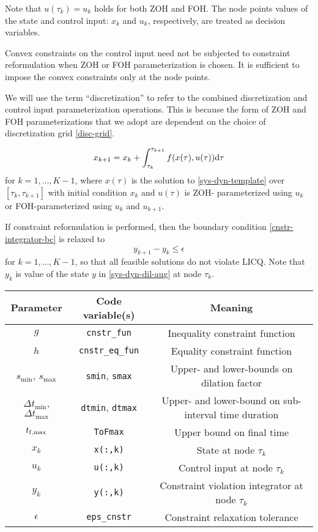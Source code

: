 \documentclass[11pt,a4paper]{article}
\begin{document}
Note that $u(\tau_k) = u_{k}$ holds for both ZOH and FOH. The node points values of the state and control input: $x_k$ and $u_k$, respectively, are treated as decision variables.

Convex constraints on the control input need not be subjected to constraint reformulation when ZOH or FOH parameterization is chosen. It is sufficient to impose the convex constraints only at the node points. 

We will use the term ``discretization'' to refer to the combined discretization and control input parameterization operations. This is because the form of ZOH and FOH parameterizations that we adopt are dependent on the choice of discretization grid \eqref{disc-grid}. 

\begin{align}
    x_{k+1} = x_{k} + \int_{\tau_k}^{\tau_{k+1}}f(x(\tau),u(\tau))\mathrm{d}\tau\label{disc-dyn}
\end{align}
for $k=1,\ldots,K-1$, where $x(\tau)$ is the solution to \eqref{sys-dyn-template} over $[\tau_k,\tau_{k+1}]$ with initial condition $x_k$ and $u(\tau)$ is ZOH- parameterized using $u_k$ or FOH-parameterized using $u_k$ and $u_{k+1}$.  

If constraint reformulation is performed, then the boundary condition \eqref{cnstr-integrator-bc} is relaxed to 
$$
    y_{k+1} - y_{k} \le \epsilon
$$
for $k=1,\ldots,K-1$, so that all feasible solutions do not violate LICQ. Note that $y_k$ is value of the state $y$ in \eqref{sys-dyn-dil-aug} at node $\tau_k$.

\begin{center}
\begin{tabular}{c|c|c}
\hline
Parameter & Code variable(s) & Meaning \\
\hline
$g$   & \verb|cnstr_fun| & Inequality constraint function \\
$h$   & \verb|cnstr_eq_fun| & Equality constraint function \\
$s_{\min}$, $s_{\max}$ & \verb|smin|, \verb|smax| & Upper- and lower-bounds on dilation factor \\
$\Delta t_{\min}$, $\Delta t_{\max}$ & \verb|dtmin|, \verb|dtmax| & Upper- and lower-bound on sub-interval time duration \\
$t_{\mathrm{f},\max}$ & \verb|ToFmax| & Upper bound on final time \\
$x_k$ & \verb|x(:,k)| & State at node $\tau_k$ \\
$u_k$ & \verb|u(:,k)| & Control input at node $\tau_k$ \\
$y_k$ & \verb|y(:,k)| & Constraint violation integrator at node $\tau_k$ \\
$\epsilon$ & \verb|eps_cnstr| & Constraint relaxation tolerance
\end{tabular}
\end{center}
\end{document}

